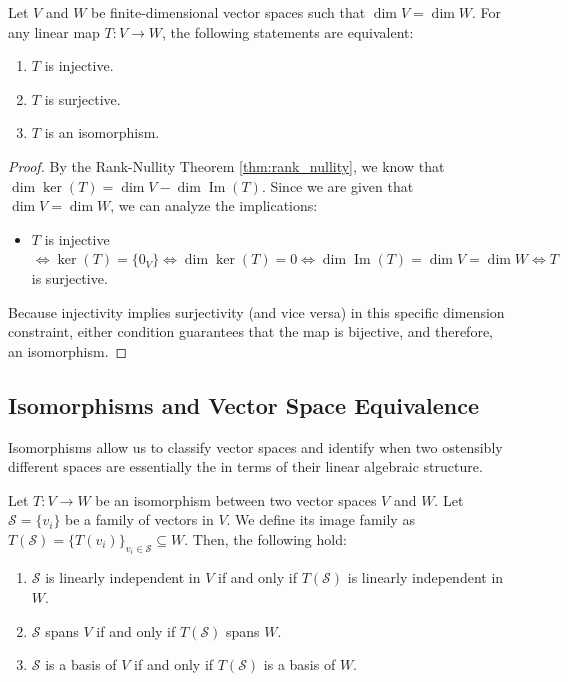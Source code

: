 \begin{corollary}
\label{cor:equal_dim_iso}
Let $V$ and $W$ be finite-dimensional vector spaces such that $\dim V = \dim W$. For any linear map $T: V \to W$, the following statements are equivalent:
\begin{enumerate}
    \item $T$ is injective.
    \item $T$ is surjective.
    \item $T$ is an isomorphism.
\end{enumerate}
\end{corollary}

\begin{proof}
By the Rank-Nullity Theorem \eqref{thm:rank_nullity}, we know that $\dim \ker(T) = \dim V - \dim \operatorname{Im}(T)$. Since we are given that $\dim V = \dim W$, we can analyze the implications:
\begin{itemize}
    \item $T$ is injective $\iff \ker(T) = \{0_V\} \iff \dim \ker(T) = 0 \iff \dim \operatorname{Im}(T) = \dim V = \dim W \iff T$ is surjective.
\end{itemize}
Because injectivity implies surjectivity (and vice versa) in this specific dimension constraint, either condition guarantees that the map is bijective, and therefore, an isomorphism.
\end{proof}

\vspace{1em}
\noindent\hrulefill
\vspace{1em}

\subsection{Isomorphisms and Vector Space Equivalence}

Isomorphisms allow us to classify vector spaces and identify when two ostensibly different spaces are essentially the  in terms of their linear algebraic structure.

\setcounter{theorem}{11} %

\begin{theorem}
\label{thm:iso_preserves_bases}
Let $T: V \to W$ be an isomorphism between two vector spaces $V$ and $W$. Let $\mathcal{S} = \{v_i\}$ be a family of vectors in $V$. We define its image family as $T(\mathcal{S}) = \{T(v_i)\}_{v_i \in \mathcal{S}} \subseteq W$. Then, the following hold:
\begin{enumerate}
    \item $\mathcal{S}$ is linearly independent in $V$ if and only if $T(\mathcal{S})$ is linearly independent in $W$.
    \item $\mathcal{S}$ spans $V$ if and only if $T(\mathcal{S})$ spans $W$.
    \item $\mathcal{S}$ is a basis of $V$ if and only if $T(\mathcal{S})$ is a basis of $W$.
\end{enumerate}
\end{theorem}

